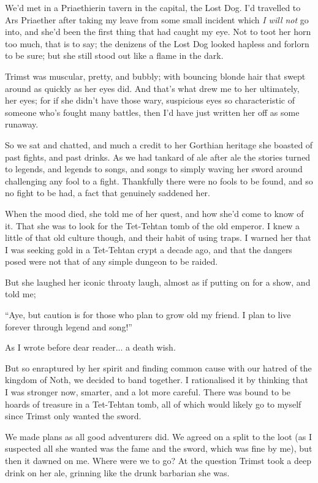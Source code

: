 \documentclass[12pt, a4paper]{book}
\begin{document}
We'd met in a Priaethierin tavern in the capital, the Lost Dog. I'd travelled to Ars Priaether after taking my leave from some small incident which \textit{I will not} go into, and she'd been the first thing that had caught my eye. Not to toot her horn too much, that is to say; the denizens of the Lost Dog looked hapless and forlorn to be sure; but she still stood out like a flame in the dark.

Trimst was muscular, pretty, and bubbly; with bouncing blonde hair that swept around as quickly as her eyes did. And that's what drew me to her ultimately, her eyes; for if she didn't have those wary, suspicious eyes so characteristic of someone who's fought many battles, then I'd have just written her off as some runaway.

So we sat and chatted, and much a credit to her Gorthian heritage she boasted of past fights, and past drinks. As we had tankard of ale after ale the stories turned to legends, and legends to songs, and songs to simply waving her sword around challenging any fool to a fight. Thankfully there were no fools to be found, and so no fight to be had, a fact that genuinely saddened her.

When the mood died, she told me of her quest, and how she'd come to know of it. That she was to look for the Tet-Tehtan tomb of the old emperor. I knew a little of that old culture though, and their habit of using traps. I warned her that I was seeking gold in a Tet-Tehtan crypt a decade ago, and that the dangers posed were not that of any simple dungeon to be raided.

But she laughed her iconic throaty laugh, almost as if putting on for a show, and told me;

``Aye, but caution is for those who plan to grow old my friend. I plan to live forever through legend and song!''

As I wrote before dear reader... a death wish. 

But so enraptured by her spirit and finding common cause with our hatred of the kingdom of Noth, we decided to band together. I rationalised it by thinking that I was stronger now, smarter, and a lot more careful. There was bound to be hoards of treasure in a Tet-Tehtan tomb, all of which would likely go to myself since Trimst only wanted the sword. 

We made plans as all good adventurers did. We agreed on a split to the loot (as I suspected all she wanted was the fame and the sword, which was fine by me), but then it dawned on me. Where were we to go? At the question Trimst took a deep drink on her ale, grinning like the drunk barbarian she was.
\end{document}

